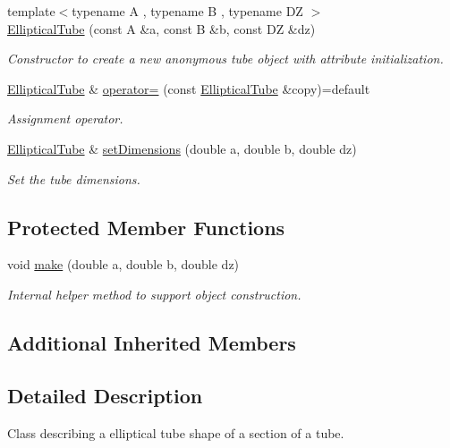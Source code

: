 \begin{DoxyCompactItemize}
{\footnotesize template$<$typename A , typename B , typename DZ $>$ }\\\hyperlink{class_d_d4hep_1_1_geometry_1_1_elliptical_tube_a84ca9e27e32ba80db9adbb26d1f400be}{Elliptical\+Tube} (const A \&a, const B \&b, const DZ \&dz)
\begin{DoxyCompactList}\small\item\em Constructor to create a new anonymous tube object with attribute initialization. \end{DoxyCompactList}\item 
\hyperlink{class_d_d4hep_1_1_geometry_1_1_elliptical_tube}{Elliptical\+Tube} \& \hyperlink{class_d_d4hep_1_1_geometry_1_1_elliptical_tube_a84ff0e55200252e49f28d9ca278b0b1f}{operator=} (const \hyperlink{class_d_d4hep_1_1_geometry_1_1_elliptical_tube}{Elliptical\+Tube} \&copy)=default
\begin{DoxyCompactList}\small\item\em Assignment operator. \end{DoxyCompactList}\item 
\hyperlink{class_d_d4hep_1_1_geometry_1_1_elliptical_tube}{Elliptical\+Tube} \& \hyperlink{class_d_d4hep_1_1_geometry_1_1_elliptical_tube_a65ee98dd3ac38b6158fa55443919c0f5}{set\+Dimensions} (double a, double b, double dz)
\begin{DoxyCompactList}\small\item\em Set the tube dimensions. \end{DoxyCompactList}\end{DoxyCompactItemize}
\subsection*{Protected Member Functions}
\begin{DoxyCompactItemize}
\item 
void \hyperlink{class_d_d4hep_1_1_geometry_1_1_elliptical_tube_a33fcff3b6382c727153417bb115bacb9}{make} (double a, double b, double dz)
\begin{DoxyCompactList}\small\item\em Internal helper method to support object construction. \end{DoxyCompactList}\end{DoxyCompactItemize}
\subsection*{Additional Inherited Members}


\subsection{Detailed Description}
Class describing a elliptical tube shape of a section of a tube. 

